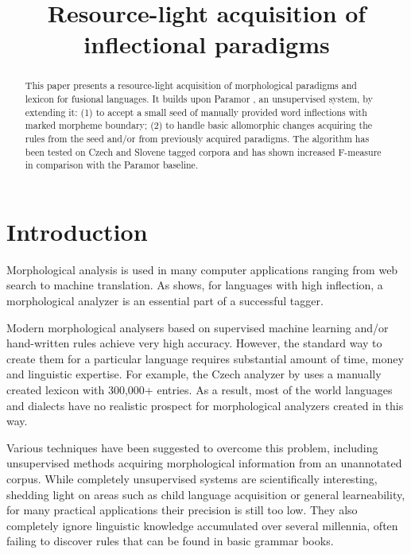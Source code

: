 \documentclass[11pt]{article}
\title{Resource-light acquisition of inflectional paradigms}
\date{}
\newcommand{\todo}[1]{[\textbf{TODO} #1]}
\begin{document}
\maketitle

\begin{abstract}
This paper presents a resource-light acquisition of morphological paradigms and lexicon for fusional languages. It builds upon Paramor \cite{monson09}, an unsupervised system, by extending it: 
%
(1) to accept a small seed of manually provided word inflections with marked morpheme boundary;
%
(2) to handle basic allomorphic changes acquiring the rules from the seed and/or from previously acquired paradigms.
The algorithm has been tested on Czech and Slovene tagged corpora and has shown increased F-measure in comparison with the Paramor baseline.
\end{abstract}

\section{Introduction}

Morphological analysis is used in many computer applications ranging from web search to machine translation. As \cite{hajic-2000-naacl} shows, for languages with high inflection, a morphological analyzer is an essential part of a successful tagger.

Modern morphological analysers based on supervised machine learning and/or hand-written rules achieve very high accuracy. However, the standard way to create them for a particular language requires substantial amount of time, money and linguistic expertise. For example, the Czech analyzer by \cite{hajic-2004-hab} uses a manually created lexicon with 300,000+ entries. As a result, most of the world languages and dialects have no realistic prospect for morphological analyzers created in this way.

Various techniques have been suggested to overcome this problem, including unsupervised methods acquiring morphological information from an unannotated corpus. While completely unsupervised systems are scientifically interesting, shedding light on areas such as child language acquisition or general learneability, for many practical applications their precision is still too low.  They also completely ignore linguistic knowledge accumulated over several millennia, often failing to discover rules that can be found in basic grammar books.
\end{document}
